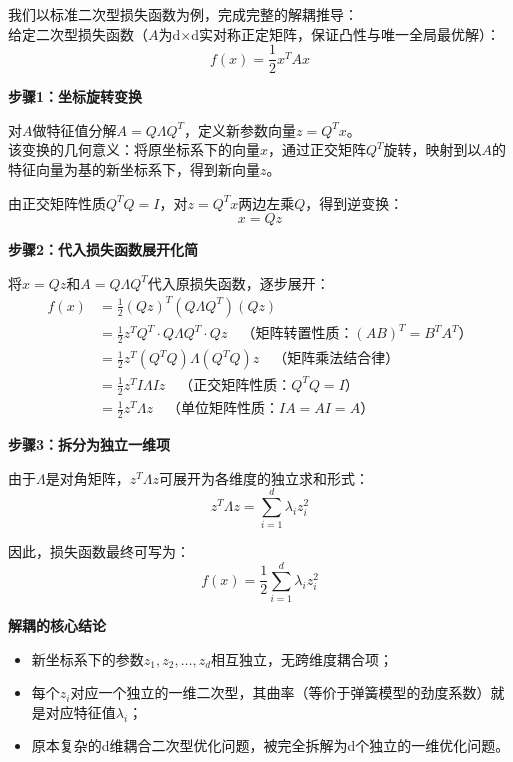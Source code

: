 \documentclass[10pt]{article}
\numberwithin{equation}{section}
\theoremstyle{plain}
\theoremstyle{definition}
\theoremstyle{remark}
\begin{document}
我们以标准二次型损失函数为例，完成完整的解耦推导：\\
给定二次型损失函数（$A$为d$\times$d实对称正定矩阵，保证凸性与唯一全局最优解）：
\[ f(x) = \frac{1}{2} x^T A x \]

{\par\vspace{0.8ex}\noindent\normalsize\bfseries\color{secblue} 步骤1：坐标旋转变换\par}
对$A$做特征值分解$A = Q \Lambda Q^T$，定义新参数向量$z = Q^T x$。\\
该变换的几何意义：将原坐标系下的向量$x$，通过正交矩阵$Q^T$旋转，映射到以$A$的特征向量为基的新坐标系下，得到新向量$z$。

由正交矩阵性质$Q^T Q = I$，对$z = Q^T x$两边左乘$Q$，得到逆变换：
\[ x = Q z \]

{\par\vspace{0.8ex}\noindent\normalsize\bfseries\color{secblue} 步骤2：代入损失函数展开化简\par}
将$x=Qz$和$A=Q\Lambda Q^T$代入原损失函数，逐步展开：
\[
\begin{aligned}
f(x) &= \frac{1}{2} (Q z)^T (Q \Lambda Q^T) (Q z) \\
&= \frac{1}{2} z^T Q^T \cdot Q \Lambda Q^T \cdot Q z \quad \text{（矩阵转置性质：$(AB)^T = B^T A^T$）} \\
&= \frac{1}{2} z^T (Q^T Q) \Lambda (Q^T Q) z \quad \text{（矩阵乘法结合律）} \\
&= \frac{1}{2} z^T I \Lambda I z \quad \text{（正交矩阵性质：$Q^T Q = I$）} \\
&= \frac{1}{2} z^T \Lambda z \quad \text{（单位矩阵性质：$IA=AI=A$）}
\end{aligned}
\]

{\par\vspace{0.8ex}\noindent\normalsize\bfseries\color{secblue} 步骤3：拆分为独立一维项\par}
由于$\Lambda$是对角矩阵，$z^T \Lambda z$可展开为各维度的独立求和形式：
\[ z^T \Lambda z = \sum_{i=1}^d \lambda_i z_i^2 \]

因此，损失函数最终可写为：
\[ f(x) = \frac{1}{2} \sum_{i=1}^d \lambda_i z_i^2 \]

\begin{SummaryBox}
\textbf{解耦的核心结论}
\begin{itemize}[leftmargin=*,nosep]
    \item 新坐标系下的参数$z_1,z_2,\dots,z_d$相互独立，无跨维度耦合项；
    \item 每个$z_i$对应一个独立的一维二次型，其曲率（等价于弹簧模型的劲度系数）就是对应特征值$\lambda_i$；
    \item 原本复杂的d维耦合二次型优化问题，被完全拆解为d个独立的一维优化问题。
\end{itemize}
\end{SummaryBox}
\end{document}
